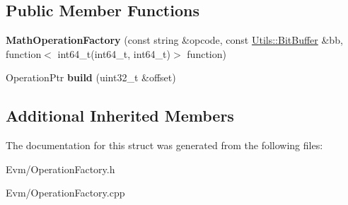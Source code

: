 \subsection*{Public Member Functions}
\begin{DoxyCompactItemize}
\item 
\mbox{\label{struct_evm_1_1_operation_1_1_math_operation_factory_a34cc15fc9a323bb761c71301db56c28b}} 
{\bfseries Math\+Operation\+Factory} (const string \&opcode, const \mbox{\hyperlink{struct_evm_1_1_utils_1_1_bit_buffer}{Utils\+::\+Bit\+Buffer}} \&bb, function$<$ int64\+\_\+t(int64\+\_\+t, int64\+\_\+t)$>$ function)
\item 
\mbox{\label{struct_evm_1_1_operation_1_1_math_operation_factory_ae4858379ee6817de0b2ac94a6d539e6e}} 
Operation\+Ptr {\bfseries build} (uint32\+\_\+t \&offset)
\end{DoxyCompactItemize}
\subsection*{Additional Inherited Members}


The documentation for this struct was generated from the following files\+:\begin{DoxyCompactItemize}
\item 
Evm/Operation\+Factory.\+h\item 
Evm/Operation\+Factory.\+cpp\end{DoxyCompactItemize}
